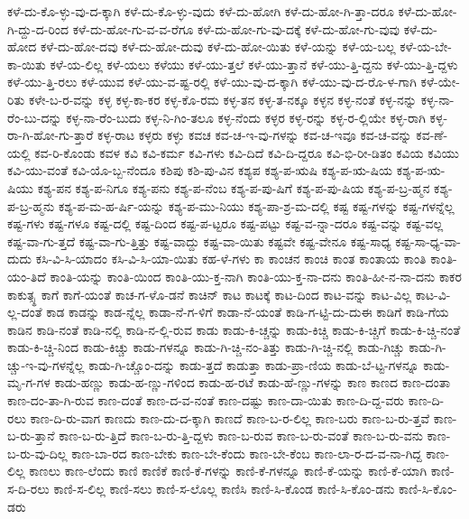 {ಕಳೆ-ದು-ಕೊ-ಳ್ಳು-ವು-ದ-ಕ್ಕಾಗಿ
ಕಳೆ-ದು-ಕೊ-ಳ್ಳು-ವುದು
ಕಳೆ-ದು-ಹೋಗಿ
ಕಳೆ-ದು-ಹೋ-ಗಿ-ತ್ತಾ-ದರೂ
ಕಳೆ-ದು-ಹೋ-ಗಿ-ದ್ದು-ದ-ರಿಂದ
ಕಳೆ-ದು-ಹೋ-ಗು-ವ-ವ-ರೆಗೂ
ಕಳೆ-ದು-ಹೋ-ಗು-ವು-ದಕ್ಕೆ
ಕಳೆ-ದು-ಹೋ-ಗು-ವುವು
ಕಳೆ-ದು-ಹೋದ
ಕಳೆ-ದು-ಹೋ-ದವು
ಕಳೆ-ದು-ಹೋ-ದುವು
ಕಳೆ-ದು-ಹೋ-ಯಿತು
ಕಳೆ-ಯನ್ನು
ಕಳೆ-ಯ-ಬಲ್ಲ
ಕಳೆ-ಯ-ಬೇ-ಕಾ-ಯಿತು
ಕಳೆ-ಯ-ಲಿಲ್ಲ
ಕಳೆ-ಯಲು
ಕಳೆಯು
ಕಳೆ-ಯು-ತ್ತಲೆ
ಕಳೆ-ಯು-ತ್ತಾನೆ
ಕಳೆ-ಯು-ತ್ತಿ-ದ್ದನು
ಕಳೆ-ಯು-ತ್ತಿ-ದ್ದಳು
ಕಳೆ-ಯು-ತ್ತಿ-ರಲು
ಕಳೆ-ಯುವ
ಕಳೆ-ಯು-ವ-ಷ್ಟ-ರಲ್ಲಿ
ಕಳೆ-ಯು-ವು-ದ-ಕ್ಕಾಗಿ
ಕಳೆ-ಯು-ವು-ದ-ರೊ-ಳ-ಗಾಗಿ
ಕಳೆ-ಯೇ-ರಿತು
ಕಳೇ-ಬ-ರ-ವನ್ನು
ಕಳ್ಳ
ಕಳ್ಳ-ಕಾ-ಕರ
ಕಳ್ಳ-ಕೊ-ರಮ
ಕಳ್ಳ-ತನ
ಕಳ್ಳ-ತ-ನಕ್ಕೂ
ಕಳ್ಳನ
ಕಳ್ಳ-ನಂತೆ
ಕಳ್ಳ-ನನ್ನು
ಕಳ್ಳ-ನಾ-ರೆಂ-ಬು-ದನ್ನು
ಕಳ್ಳ-ನಾ-ರೆಂ-ಬುದು
ಕಳ್ಳ-ನಿ-ಗಿಂ-ತಲೂ
ಕಳ್ಳ-ನೆಂದು
ಕಳ್ಳರ
ಕಳ್ಳ-ರನ್ನು
ಕಳ್ಳ-ರ-ಲ್ಲಿಯೇ
ಕಳ್ಳ-ರಾಗಿ
ಕಳ್ಳ-ರಾ-ಗಿ-ಹೋ-ಗು-ತ್ತಾರೆ
ಕಳ್ಳ-ರಾಟ
ಕಳ್ಳರು
ಕಳ್ಳು
ಕವಚ
ಕವ-ಚ-ಇ-ವು-ಗಳನ್ನು
ಕವ-ಚ-ಇವೂ
ಕವ-ಚ-ವನ್ನು
ಕವ-ಣೆ-ಯಲ್ಲಿ
ಕವ-ರಿ-ಕೊಂಡು
ಕವಳ
ಕವಿ
ಕವಿ-ಕರ್ಮ
ಕವಿ-ಗಳು
ಕವಿ-ದಿದೆ
ಕವಿ-ದಿ-ದ್ದರೂ
ಕವಿ-ಭಿ-ರೀ-ಡಿತಂ
ಕವಿಯ
ಕವಿಯು
ಕವಿ-ಯು-ವಂತೆ
ಕವಿ-ಯೊ-ಬ್ಬ-ನೆಂದೂ
ಕಶಿಪು
ಕಶಿ-ಪು-ವಿನ
ಕಶ್ಯಪ
ಕಶ್ಯ-ಪ-ಋಷಿ
ಕಶ್ಯ-ಪ-ಋ-ಷಿಯ
ಕಶ್ಯ-ಪ-ಋ-ಷಿಯು
ಕಶ್ಯ-ಪನ
ಕಶ್ಯ-ಪ-ನಿಗೂ
ಕಶ್ಯ-ಪನು
ಕಶ್ಯ-ಪ-ನೆಂಬ
ಕಶ್ಯ-ಪ-ಪು-ಷಿಗೆ
ಕಶ್ಯ-ಪ-ಪು-ಷಿಯ
ಕಶ್ಯ-ಪ-ಬ್ರ-ಹ್ಮನ
ಕಶ್ಯ-ಪ-ಬ್ರ-ಹ್ಮನು
ಕಶ್ಯ-ಪ-ಮ-ಹ-ರ್ಷಿ-ಯನ್ನು
ಕಶ್ಯ-ಪ-ಮು-ನಿಯು
ಕಶ್ಯ-ಪಾ-ಶ್ರ-ಮ-ದಲ್ಲಿ
ಕಷ್ಟ
ಕಷ್ಟ-ಗಳನ್ನು
ಕಷ್ಟ-ಗಳನ್ನೆಲ್ಲ
ಕಷ್ಟ-ಗಳು
ಕಷ್ಟ-ಗಳೂ
ಕಷ್ಟ-ದಲ್ಲಿ
ಕಷ್ಟ-ದಿಂದ
ಕಷ್ಟ-ಪ-ಟ್ಟರೂ
ಕಷ್ಟ-ಪಟ್ಟು
ಕಷ್ಟ-ವ-ನ್ನಾ-ದರೂ
ಕಷ್ಟ-ವನ್ನು
ಕಷ್ಟ-ವಲ್ಲ
ಕಷ್ಟ-ವಾ-ಗು-ತ್ತದೆ
ಕಷ್ಟ-ವಾ-ಗು-ತ್ತಿತ್ತು
ಕಷ್ಟ-ವಾದ್ದು
ಕಷ್ಟ-ವಾ-ಯಿತು
ಕಷ್ಟವೇ
ಕಷ್ಟ-ವೇನೂ
ಕಷ್ಟ-ಸಾಧ್ಯ
ಕಷ್ಟ-ಸಾ-ಧ್ಯ-ವಾ-ದುದು
ಕಸಿ-ವಿ-ಸಿ-ಯಾದಂ
ಕಸಿ-ವಿ-ಸಿ-ಯಾ-ಯಿತು
ಕಹ-ಳೆ-ಗಳು
ಕಾ
ಕಾಂಚನ
ಕಾಂಚಿ
ಕಾಂತ
ಕಾಂತಾಯ
ಕಾಂತಿ
ಕಾಂತಿ-ಯಂ-ತಿದೆ
ಕಾಂತಿ-ಯನ್ನು
ಕಾಂತಿ-ಯಿಂದ
ಕಾಂತಿ-ಯು-ಕ್ತ-ನಾಗಿ
ಕಾಂತಿ-ಯು-ಕ್ತ-ನಾ-ದನು
ಕಾಂತಿ-ಹೀ-ನ-ನಾ-ದನು
ಕಾಕರ
ಕಾಕುತ್ಸ್ಥ
ಕಾಗೆ
ಕಾಗೆ-ಯಂತೆ
ಕಾಚ-ಗ-ಳೊ-ಡನೆ
ಕಾಚಿನ್
ಕಾಟ
ಕಾಟಕ್ಕೆ
ಕಾಟ-ದಿಂದ
ಕಾಟ-ವನ್ನು
ಕಾಟ-ವಿಲ್ಲ
ಕಾಟ-ವಿ-ಲ್ಲ-ದಂತೆ
ಕಾಡ
ಕಾಡನ್ನು
ಕಾಡ-ನ್ನೆಲ್ಲ
ಕಾಡಾ-ನೆ-ಗ-ಳಿಗೆ
ಕಾಡಾ-ನೆ-ಯಂತೆ
ಕಾಡಿ-ಗ-ಟ್ಟಿ-ದು-ದುಈ
ಕಾಡಿಗೆ
ಕಾಡಿ-ಗೆಯ
ಕಾಡಿನ
ಕಾಡಿ-ನಂತೆ
ಕಾಡಿ-ನಲ್ಲಿ
ಕಾಡಿ-ನ-ಲ್ಲಿ-ರುವ
ಕಾಡು
ಕಾಡು-ಕಿ-ಚ್ಚನ್ನು
ಕಾಡು-ಕಿಚ್ಚಿ
ಕಾಡು-ಕಿ-ಚ್ಚಿಗೆ
ಕಾಡು-ಕಿ-ಚ್ಚಿ-ನಂತೆ
ಕಾಡು-ಕಿ-ಚ್ಚಿ-ನಿಂದ
ಕಾಡು-ಕಿಚ್ಚು
ಕಾಡು-ಗಳನ್ನೂ
ಕಾಡು-ಗಿ-ಚ್ಚಿ-ನಂ-ತಿತ್ತು
ಕಾಡು-ಗಿ-ಚ್ಚಿ-ನಲ್ಲಿ
ಕಾಡು-ಗಿಚ್ಚು
ಕಾಡು-ಗಿ-ಚ್ಚು-ಇ-ವು-ಗಳನ್ನೆಲ್ಲ
ಕಾಡು-ಗಿ-ಚ್ಚೊಂ-ದನ್ನು
ಕಾಡು-ತ್ತದೆ
ಕಾಡುತ್ತಾ
ಕಾಡು-ಪ್ರಾ-ಣಿಯ
ಕಾಡು-ಬೆ-ಟ್ಟ-ಗಳನ್ನೂ
ಕಾಡು-ಮೃ-ಗ-ಗಳ
ಕಾಡು-ಹಣ್ಣು
ಕಾಡು-ಹ-ಣ್ಣು-ಗಳಿಂದ
ಕಾಡು-ಹ-ರಟೆ
ಕಾಡು-ಹೆ-ಣ್ಣು-ಗಳನ್ನು
ಕಾಣ
ಕಾಣದ
ಕಾಣ-ದಂತಾ
ಕಾಣ-ದಂ-ತಾ-ಗಿ-ರುವ
ಕಾಣ-ದಂತೆ
ಕಾಣ-ದ-ವ-ನಂತೆ
ಕಾಣ-ದಷ್ಟು
ಕಾಣ-ದಾ-ಯಿತು
ಕಾಣ-ದಿ-ದ್ದ-ವರು
ಕಾಣ-ದಿ-ರಲು
ಕಾಣ-ದಿ-ರು-ವಾಗ
ಕಾಣದು
ಕಾಣ-ದು-ದ-ಕ್ಕಾಗಿ
ಕಾಣದೆ
ಕಾಣ-ಬ-ರ-ಲಿಲ್ಲ
ಕಾಣ-ಬರು
ಕಾಣ-ಬ-ರು-ತ್ತವೆ
ಕಾಣ-ಬ-ರು-ತ್ತಾನೆ
ಕಾಣ-ಬ-ರು-ತ್ತಿದೆ
ಕಾಣ-ಬ-ರು-ತ್ತಿ-ದ್ದಳು
ಕಾಣ-ಬ-ರುವ
ಕಾಣ-ಬ-ರು-ವಂತೆ
ಕಾಣ-ಬ-ರು-ವನು
ಕಾಣ-ಬ-ರು-ವು-ದಿಲ್ಲ
ಕಾಣ-ಬಾ-ರದ
ಕಾಣ-ಬೇಕು
ಕಾಣ-ಬೇ-ಕೆಂದು
ಕಾಣ-ಬೇ-ಕೆಂಬ
ಕಾಣ-ಲಾ-ರ-ದ-ವ-ನಾ-ಗಿದ್ದ
ಕಾಣ-ಲಿಲ್ಲ
ಕಾಣಲು
ಕಾಣ-ಲೆಂದು
ಕಾಣಿ
ಕಾಣಿಕೆ
ಕಾಣಿ-ಕೆ-ಗಳನ್ನು
ಕಾಣಿ-ಕೆ-ಗಳನ್ನೂ
ಕಾಣಿ-ಕೆ-ಯನ್ನು
ಕಾಣಿ-ಕೆ-ಯಾಗಿ
ಕಾಣಿ-ಸ-ದಿ-ರಲು
ಕಾಣಿ-ಸ-ಲಿಲ್ಲ
ಕಾಣಿ-ಸಲು
ಕಾಣಿ-ಸ-ಲೊಲ್ಲ
ಕಾಣಿಸಿ
ಕಾಣಿ-ಸಿ-ಕೊಂಡ
ಕಾಣಿ-ಸಿ-ಕೊಂ-ಡನು
ಕಾಣಿ-ಸಿ-ಕೊಂ-ಡರು
}
